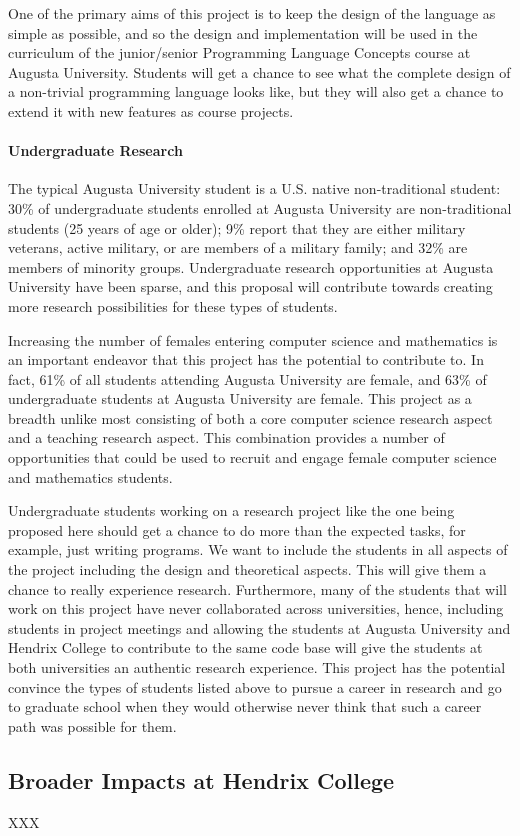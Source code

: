 One of the primary aims of this project is to keep the design of the
language as simple as possible, and so the design and implementation
will be used in the curriculum of the junior/senior Programming
Language Concepts course at Augusta University.  Students will get a
chance to see what the complete design of a non-trivial programming
language looks like, but they will also get a chance to extend it with
new features as course projects.

\paragraph{Undergraduate Research}  The typical Augusta University
student is a U.S. native non-traditional student: 30\% of
undergraduate students enrolled at Augusta University are
non-traditional students (25 years of age or older); 9\% report that
they are either military veterans, active military, or are members of
a military family; and 32\% are members of minority groups.
Undergraduate research opportunities at Augusta University have been
sparse, and this proposal will contribute towards creating more
research possibilities for these types of students.


Increasing the number of females entering computer science and
mathematics is an important endeavor that this project has the
potential to contribute to.  In fact, 61\% of all students attending
Augusta University are female, and 63\% of undergraduate students at
Augusta University are female.  This project as a breadth unlike most
consisting of both a core computer science research aspect and a
teaching research aspect.  This combination provides a number of
opportunities that could be used to recruit and engage female computer
science and mathematics students.

Undergraduate students working on a research project like the one
being proposed here should get a chance to do more than the expected
tasks, for example, just writing programs.  We want to include the
students in all aspects of the project including the design and
theoretical aspects.  This will give them a chance to really
experience research.  Furthermore, many of the students that will work
on this project have never collaborated across universities, hence,
including students in project meetings and allowing the students at
Augusta University and Hendrix College to contribute to the same code
base will give the students at both universities an authentic research
experience.  This project has the potential convince the types of
students listed above to pursue a career in research and go to
graduate school when they would otherwise never think that such a
career path was possible for them.

\subsection{Broader Impacts at Hendrix College}
\label{subsec:broader_impacts_at_hendrix_college}
XXX

